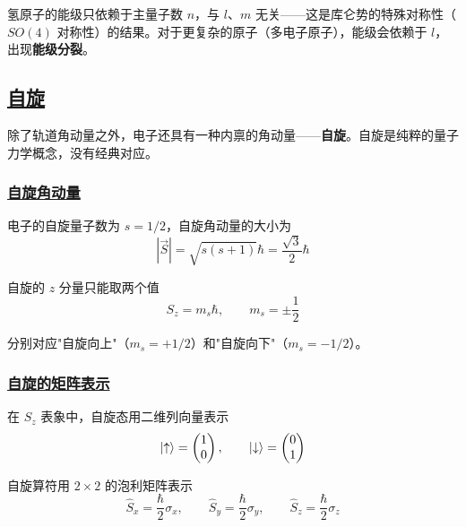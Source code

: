 \begin{remark}
    氢原子的能级只依赖于主量子数 $n$，与 $l$、$m$ 无关——这是库仑势的特殊对称性（$SO(4)$ 对称性）的结果。对于更复杂的原子（多电子原子），能级会依赖于 $l$，出现\textbf{能级分裂}。
\end{remark}

\subsection{\protect\hyperlink{:}{自旋}}

除了轨道角动量之外，电子还具有一种内禀的角动量——\textbf{自旋}。自旋是纯粹的量子力学概念，没有经典对应。

\subsubsection{\protect\hyperlink{:}{自旋角动量}}

电子的自旋量子数为 $s = 1/2$，自旋角动量的大小为
\begin{equation}
    |\vec{S}| = \sqrt{s(s+1)}\hbar = \frac{\sqrt{3}}{2}\hbar
\end{equation}

自旋的 $z$ 分量只能取两个值
\begin{equation}
    S_z = m_s\hbar, \qquad m_s = \pm\frac{1}{2}
\end{equation}

分别对应"自旋向上"（$m_s = +1/2$）和"自旋向下"（$m_s = -1/2$）。

\subsubsection{\protect\hyperlink{:}{自旋的矩阵表示}}

在 $S_z$ 表象中，自旋态用二维列向量表示
\begin{equation}
    \ket{\uparrow} = \begin{pmatrix} 1 \\ 0 \end{pmatrix}, \qquad \ket{\downarrow} = \begin{pmatrix} 0 \\ 1 \end{pmatrix}
\end{equation}

自旋算符用 $2\times 2$ 的泡利矩阵表示
\begin{equation}
    \hat{S}_x = \frac{\hbar}{2}\sigma_x, \qquad \hat{S}_y = \frac{\hbar}{2}\sigma_y, \qquad \hat{S}_z = \frac{\hbar}{2}\sigma_z
\end{equation}

